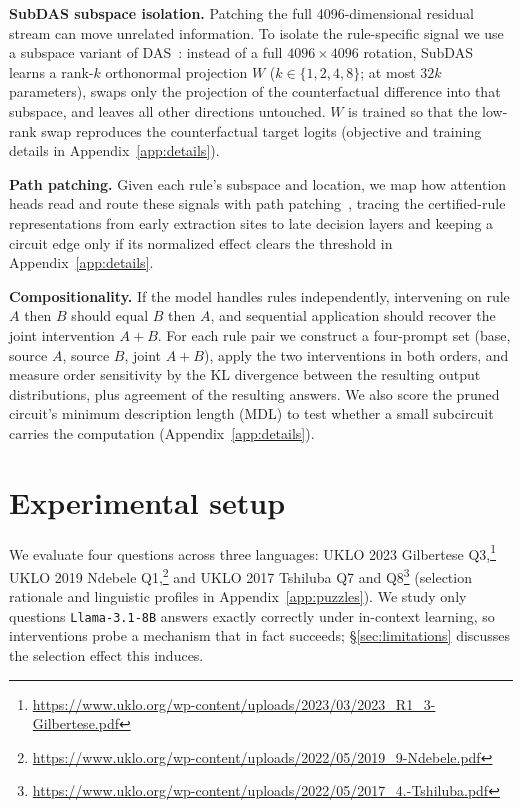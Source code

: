\documentclass{article}
\begin{document}
\textbf{SubDAS subspace isolation.}
Patching the full 4096-dimensional residual stream can move unrelated
information. To isolate the rule-specific signal we use a subspace variant of
DAS~\citep{geiger2023das,wu2023boundless}: instead of a full $4096 \times
4096$ rotation, SubDAS learns a rank-$k$ orthonormal projection $W$
($k \in \{1,2,4,8\}$; at most $32k$ parameters), swaps only the projection of
the counterfactual difference into that subspace, and leaves all other
directions untouched. $W$ is trained so that the low-rank swap reproduces the
counterfactual target logits (objective and training details in
Appendix~\ref{app:details}).

\textbf{Path patching.}
Given each rule's subspace and location, we map how attention heads read and
route these signals with path patching~\citep{wang2022ioi,goldowskydill2023},
tracing the certified-rule representations from early extraction sites to late
decision layers and keeping a circuit edge only if its normalized effect
clears the threshold in Appendix~\ref{app:details}.

\textbf{Compositionality.}
If the model handles rules independently, intervening on rule $A$ then $B$
should equal $B$ then $A$, and sequential application should recover the joint
intervention $A{+}B$. For each rule pair we construct a four-prompt set (base,
source $A$, source $B$, joint $A{+}B$), apply the two interventions in both
orders, and measure order sensitivity by the KL divergence between the
resulting output distributions, plus agreement of the resulting answers. We
also score the pruned circuit's minimum description length (MDL) to test
whether a small subcircuit carries the computation
(Appendix~\ref{app:details}).

\section{Experimental setup}
\label{sec:setup}

We evaluate four questions across three languages: UKLO 2023 Gilbertese
Q3,\footnote{\url{https://www.uklo.org/wp-content/uploads/2023/03/2023_R1_3-Gilbertese.pdf}}
UKLO 2019 Ndebele
Q1,\footnote{\url{https://www.uklo.org/wp-content/uploads/2022/05/2019_9-Ndebele.pdf}}
and UKLO 2017 Tshiluba Q7 and
Q8\footnote{\url{https://www.uklo.org/wp-content/uploads/2022/05/2017_4.-Tshiluba.pdf}}
(selection rationale and linguistic profiles in Appendix~\ref{app:puzzles}).
We study only questions \texttt{Llama-3.1-8B} answers exactly correctly under
in-context learning, so interventions probe a mechanism that in fact succeeds;
\S\ref{sec:limitations} discusses the selection effect this induces.
\end{document}
